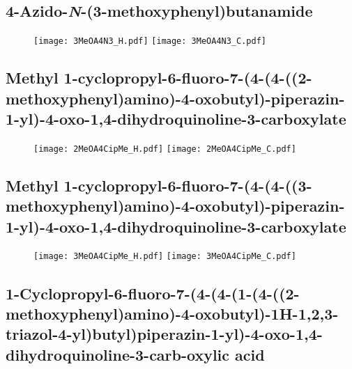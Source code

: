 \subsection{4\hyp{}Azido\hyp{}\textit{N}\hyp{}(3\hyp{}methoxyphenyl)butanamide }

\begin{figure}[H]
	\centering
		\texttt{[image: 3MeOA4N3\_H.pdf]}
		\texttt{[image: 3MeOA4N3\_C.pdf]}
\end{figure}

\subsection{Methyl 1\hyp{}cyclopropyl\hyp{}6\hyp{}fluoro\hyp{}7\hyp{}(4\hyp{}(4\hyp{}((2\hyp{}methoxyphenyl)amino)\hyp{}4\hyp{}oxobutyl)\hyp{}piperazin\hyp{}1\hyp{}yl)\hyp{}4\hyp{}oxo\hyp{}1,4\hyp{}dihydroquinoline\hyp{}3\hyp{}carboxylate }

\begin{figure}[H]
	\centering
		\texttt{[image: 2MeOA4CipMe\_H.pdf]}
		\texttt{[image: 2MeOA4CipMe\_C.pdf]}
\end{figure}

\subsection{Methyl 1\hyp{}cyclopropyl\hyp{}6\hyp{}fluoro\hyp{}7\hyp{}(4\hyp{}(4\hyp{}((3\hyp{}methoxyphenyl)amino)\hyp{}4\hyp{}oxobutyl)\hyp{}piperazin\hyp{}1\hyp{}yl)\hyp{}4\hyp{}oxo\hyp{}1,4\hyp{}dihydroquinoline\hyp{}3\hyp{}carboxylate }

\begin{figure}[H]
	\centering
		\texttt{[image: 3MeOA4CipMe\_H.pdf]}
		\texttt{[image: 3MeOA4CipMe\_C.pdf]}
\end{figure}

\subsection{1\hyp{}Cyclopropyl\hyp{}6\hyp{}fluoro\hyp{}7\hyp{}(4\hyp{}(4\hyp{}(1\hyp{}(4\hyp{}((2\hyp{}methoxyphenyl)amino)\hyp{}4\hyp{}oxobutyl)\hyp{}1H\hyp{}1,2,3\hyp{}triazol\hyp{}4\hyp{}yl)butyl)piperazin\hyp{}1\hyp{}yl)\hyp{}4\hyp{}oxo\hyp{}1,4\hyp{}dihydroquinoline\hyp{}3\hyp{}carb\hyp{}oxylic acid }

